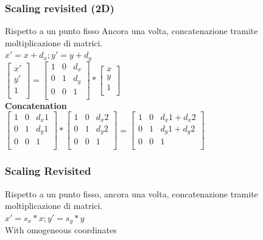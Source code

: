 \subsubsection{Scaling revisited (2D)}
Rispetto a un punto fisso
Ancora una volta, concatenazione tramite moltiplicazione di matrici.
\\
$x'=x+d_x;y'=y+d_y$
\\
$\begin{bmatrix}
    x' \\
    y' \\
    1 \\
\end{bmatrix}
=
\begin{bmatrix}
1 & 0 & d_x \\
0 & 1 & d_y \\
0 & 0 & 1\\
\end{bmatrix}
*
\begin{bmatrix}
    x \\
    y \\
    1 \\
\end{bmatrix}
$
\\
\textbf{Concatenation}
\\
$
\begin{bmatrix}
    1 & 0 & d_x1 \\
    0 & 1 & d_y1 \\
    0 & 0 & 1 \\
\end{bmatrix}
*
\begin{bmatrix}
    1 & 0 & d_x2 \\
    0 & 1 & d_y2 \\
    0 & 0 & 1 \\
\end{bmatrix}
=
\begin{bmatrix}
    1 & 0 & d_x1+d_x2 \\
    0 & 1 & d_y1+d_y2 \\
    0 & 0 & 1 \\
\end{bmatrix}
$
\subsubsection{Scaling Revisited}
Rispetto a un punto fisso, ancora una volta, concatenazione tramite moltiplicazione di matrici.
\\
$x'=s_x*x; y'=s_y*y$
\\
With omogeneous coordinates \\


